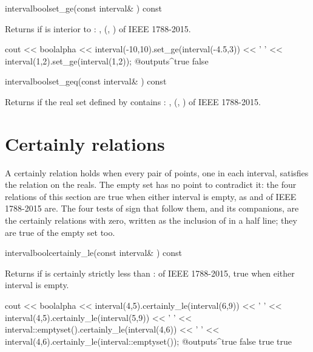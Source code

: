 \begin{defmethod}{interval}{bool}{set\_ge}{(const interval\& ) const}
  \begin{operation}
  \end{operation}
  Returns  if  is interior to :
  , (,
  ) of IEEE 1788-2015.\newinvfive
\begin{example}
cout << boolalpha << interval(-10,10).set_ge(interval(-4.5,3)) << ' '
     << interval(1,2).set_ge(interval(1,2));
@outputs^true false~
\end{example}
\end{defmethod}

\begin{defmethod}{interval}{bool}{set\_geq}{(const interval\& ) const}
  \begin{operation}
  \end{operation}
  Returns  if the real set defined by  contains
  : , (,
  ) of IEEE 1788-2015.
\end{defmethod}

\section{Certainly relations}\label{sec:relations-certainly}

A certainly relation holds when every pair of points, one in each interval,
satisfies the relation on the reals. The empty set has no point to
contradict it: the four relations of this section are true when either
interval is empty, as  and  of
IEEE 1788-2015 are.\newinvfive{} The four tests of sign that follow them,
 and its companions, are the certainly relations
with zero, written as the inclusion of  in a half line; they are
true of the empty set too.

\begin{defmethod}{interval}{bool}{certainly\_le}{(const interval\& ) const}
  \begin{operation}
  \end{operation}
  Returns  if  is certainly strictly less than
  :  of IEEE 1788-2015, true when either
  interval is empty.\newinvfive
  \begin{example}
cout << boolalpha << interval(4,5).certainly_le(interval(6,9)) << ' '
     << interval(4,5).certainly_le(interval(5,9)) << ' '
     << interval::emptyset().certainly_le(interval(4,6)) << ' '
     << interval(4,6).certainly_le(interval::emptyset());
@outputs^true false true true~
  \end{example}
\end{defmethod}

